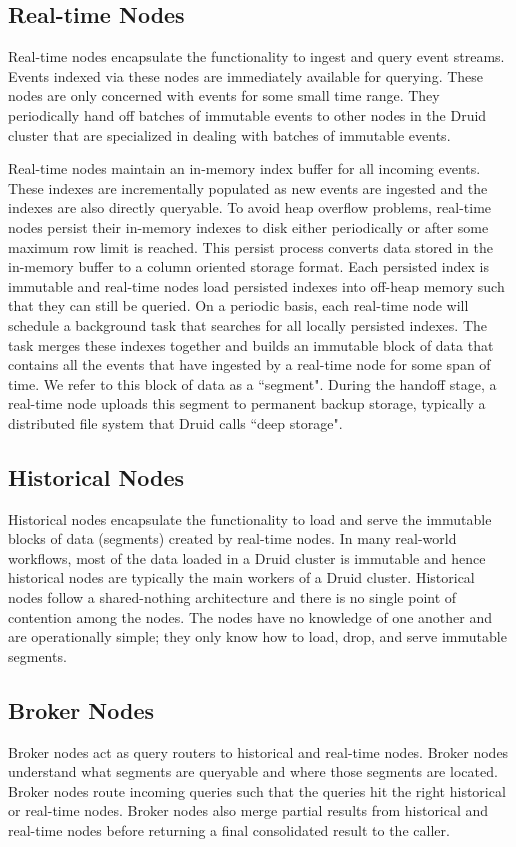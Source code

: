 \documentclass{vldb}
\begin{document}
\subsection{Real-time Nodes}
Real-time nodes encapsulate the functionality to ingest and query event
streams. Events indexed via these nodes are immediately available for querying.
These nodes are only concerned with events for some small time range. They
periodically hand off batches of immutable events to other nodes in the Druid
cluster that are specialized in dealing with batches of immutable events.

Real-time nodes maintain an in-memory index buffer for all incoming events.
These indexes are incrementally populated as new events are ingested and the
indexes are also directly queryable. To avoid heap overflow problems, real-time
nodes persist their in-memory indexes to disk either periodically or after some
maximum row limit is reached. This persist process converts data stored in the
in-memory buffer to a column oriented storage format. Each persisted index is
immutable and real-time nodes load persisted indexes into off-heap memory such
that they can still be queried. On a periodic basis, each real-time node will
schedule a background task that searches for all locally persisted indexes. The
task merges these indexes together and builds an immutable block of data that
contains all the events that have ingested by a real-time node for some span of
time. We refer to this block of data as a ``segment". During the handoff stage,
a real-time node uploads this segment to permanent backup storage, typically
a distributed file system that Druid calls ``deep storage".

\subsection{Historical Nodes}
Historical nodes encapsulate the functionality to load and serve the immutable
blocks of data (segments) created by real-time nodes. In many real-world
workflows, most of the data loaded in a Druid cluster is immutable and hence
historical nodes are typically the main workers of a Druid cluster.  Historical
nodes follow a shared-nothing architecture and there is no single point of
contention among the nodes. The nodes have no knowledge of one another and are
operationally simple; they only know how to load, drop, and serve immutable
segments.

\subsection{Broker Nodes}
Broker nodes act as query routers to historical and real-time nodes. Broker
nodes understand what segments are queryable and where those segments are
located. Broker nodes route incoming queries such that the queries hit the
right historical or real-time nodes. Broker nodes also merge partial results
from historical and real-time nodes before returning a final consolidated
result to the caller.
\end{document}

